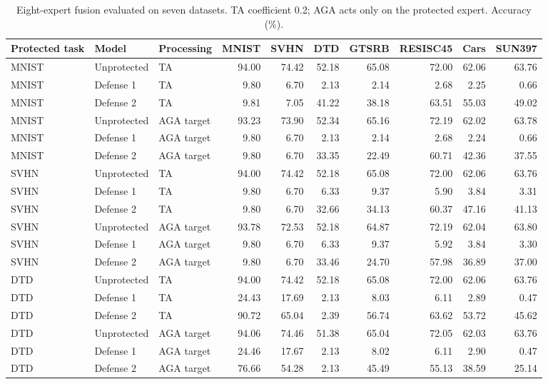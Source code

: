 \begin{table}[t]
\centering\small
\caption{Eight-expert fusion evaluated on seven datasets. TA coefficient 0.2; AGA acts only on the protected expert. Accuracy (\%).}
\begin{tabular}{lllrrrrrrr}
\toprule
Protected task & Model & Processing & MNIST & SVHN & DTD & GTSRB & RESISC45 & Cars & SUN397 \\
\midrule
MNIST & Unprotected & TA & 94.00 & 74.42 & 52.18 & 65.08 & 72.00 & 62.06 & 63.76 \\
MNIST & Defense 1 & TA & 9.80 & 6.70 & 2.13 & 2.14 & 2.68 & 2.25 & 0.66 \\
MNIST & Defense 2 & TA & 9.81 & 7.05 & 41.22 & 38.18 & 63.51 & 55.03 & 49.02 \\
MNIST & Unprotected & AGA target & 93.23 & 73.90 & 52.34 & 65.16 & 72.19 & 62.02 & 63.78 \\
MNIST & Defense 1 & AGA target & 9.80 & 6.70 & 2.13 & 2.14 & 2.68 & 2.24 & 0.66 \\
MNIST & Defense 2 & AGA target & 9.80 & 6.70 & 33.35 & 22.49 & 60.71 & 42.36 & 37.55 \\
SVHN & Unprotected & TA & 94.00 & 74.42 & 52.18 & 65.08 & 72.00 & 62.06 & 63.76 \\
SVHN & Defense 1 & TA & 9.80 & 6.70 & 6.33 & 9.37 & 5.90 & 3.84 & 3.31 \\
SVHN & Defense 2 & TA & 9.80 & 6.70 & 32.66 & 34.13 & 60.37 & 47.16 & 41.13 \\
SVHN & Unprotected & AGA target & 93.78 & 72.53 & 52.18 & 64.87 & 72.19 & 62.04 & 63.80 \\
SVHN & Defense 1 & AGA target & 9.80 & 6.70 & 6.33 & 9.37 & 5.92 & 3.84 & 3.30 \\
SVHN & Defense 2 & AGA target & 9.80 & 6.70 & 33.46 & 24.70 & 57.98 & 36.89 & 37.00 \\
DTD & Unprotected & TA & 94.00 & 74.42 & 52.18 & 65.08 & 72.00 & 62.06 & 63.76 \\
DTD & Defense 1 & TA & 24.43 & 17.69 & 2.13 & 8.03 & 6.11 & 2.89 & 0.47 \\
DTD & Defense 2 & TA & 90.72 & 65.04 & 2.39 & 56.74 & 63.62 & 53.72 & 45.62 \\
DTD & Unprotected & AGA target & 94.06 & 74.46 & 51.38 & 65.04 & 72.05 & 62.03 & 63.76 \\
DTD & Defense 1 & AGA target & 24.46 & 17.67 & 2.13 & 8.02 & 6.11 & 2.90 & 0.47 \\
DTD & Defense 2 & AGA target & 76.66 & 54.28 & 2.13 & 45.49 & 55.13 & 38.59 & 25.14 \\
\bottomrule
\end{tabular}
\end{table}
